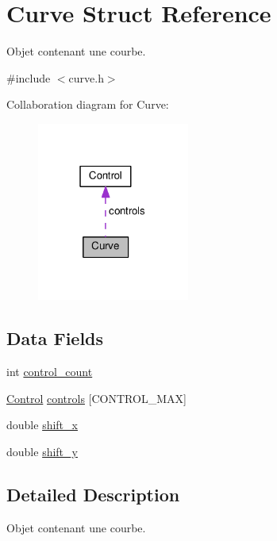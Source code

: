 \hypertarget{struct_curve}{}\section{Curve Struct Reference}
\label{struct_curve}


Objet contenant une courbe.  




{\ttfamily \#include $<$curve.\+h$>$}



Collaboration diagram for Curve\+:
\nopagebreak
\begin{figure}[H]
\begin{center}
\leavevmode
\includegraphics[width=142pt]{struct_curve__coll__graph}
\end{center}
\end{figure}
\subsection*{Data Fields}
\begin{DoxyCompactItemize}
\item 
int \hyperlink{struct_curve_a59a5b03dc125415956c7a70d6ca5f1c9}{control\+\_\+count}
\item 
\hyperlink{struct_control}{Control} \hyperlink{struct_curve_a4ee2ee7a61aec07c8125cf99d3aca658}{controls} \mbox{[}C\+O\+N\+T\+R\+O\+L\+\_\+\+M\+AX\mbox{]}
\item 
double \hyperlink{struct_curve_ae0904aba32ac63f201e7b09c5a369801}{shift\+\_\+x}
\item 
double \hyperlink{struct_curve_acf3ad5e60603cbced782bbebef4e0d06}{shift\+\_\+y}
\end{DoxyCompactItemize}


\subsection{Detailed Description}
Objet contenant une courbe. 

